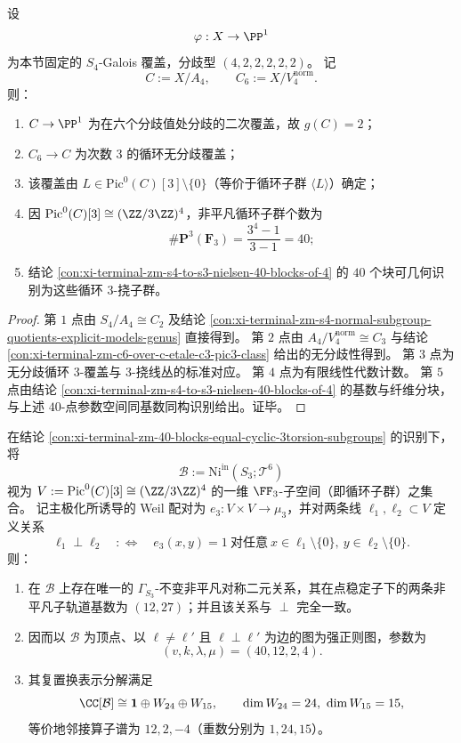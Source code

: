 \begin{conclusion}\label{con:xi-terminal-zm-40-blocks-equal-cyclic-3torsion-subgroups}
设
\[
\varphi:X\to\PP^1
\]
为本节固定的 \(S_4\)-Galois 覆盖，分歧型 \((4,2,2,2,2,2)\)。
记
\[
C:=X/A_4,\qquad C_6:=X/V_4^{\mathrm{norm}}.
\]
则：
\begin{enumerate}
  \item \(C\to\PP^1\) 为在六个分歧值处分歧的二次覆盖，故 \(g(C)=2\)；
  \item \(C_6\to C\) 为次数 \(3\) 的循环无分歧覆盖；
  \item 该覆盖由 \(L\in \mathrm{Pic}^0(C)[3]\setminus\{0\}\)（等价于循环子群 \(\langle L\rangle\)）确定；
  \item 因 \(\mathrm{Pic}^0(C)[3]\cong (\ZZ/3\ZZ)^4\)，非平凡循环子群个数为
  \[
  \#\mathbf P^3(\mathbf F_3)=\frac{3^4-1}{3-1}=40;
  \]
  \item 结论 \ref{con:xi-terminal-zm-s4-to-s3-nielsen-40-blocks-of-4} 的 \(40\) 个块可几何识别为这些循环 \(3\)-挠子群。
\end{enumerate}
\end{conclusion}
\begin{proof}
第 \(1\) 点由 \(S_4/A_4\cong C_2\) 及结论
\ref{con:xi-terminal-zm-s4-normal-subgroup-quotients-explicit-models-genus}
直接得到。
第 \(2\) 点由 \(A_4/V_4^{\mathrm{norm}}\cong C_3\) 与结论
\ref{con:xi-terminal-zm-c6-over-c-etale-c3-pic3-class}
给出的无分歧性得到。
第 \(3\) 点为无分歧循环 \(3\)-覆盖与 \(3\)-挠线丛的标准对应。
第 \(4\) 点为有限线性代数计数。
第 \(5\) 点由结论 \ref{con:xi-terminal-zm-s4-to-s3-nielsen-40-blocks-of-4} 的基数与纤维分块，与上述 \(40\)-点参数空间同基数同构识别给出。证毕。
\end{proof}

\begin{theorem}[块轨道的辛正交刻画与强正则结构]\label{thm:xi-terminal-zm-block-orbits-symplectic-orthogonality-srg}
在结论 \ref{con:xi-terminal-zm-40-blocks-equal-cyclic-3torsion-subgroups} 的识别下，将
\[
\mathcal B:=\mathrm{Ni}^{\mathrm{in}}(S_3;\mathcal T^6)
\]
视为 \(V:=\mathrm{Pic}^0(C)[3]\cong (\ZZ/3\ZZ)^4\) 的一维 \(\FF_3\)-子空间（即循环子群）之集合。
记主极化所诱导的 Weil 配对为 \(e_3:V\times V\to\mu_3\)，并对两条线 \(\ell_1,\ell_2\subset V\) 定义关系
\[
\ell_1\perp \ell_2
\quad:\Longleftrightarrow\quad
e_3(x,y)=1\ \text{对任意}\ x\in\ell_1\setminus\{0\},\ y\in\ell_2\setminus\{0\}.
\]
则：
\begin{enumerate}
  \item 在 \(\mathcal B\) 上存在唯一的 \(\Gamma_{S_3}\)-不变非平凡对称二元关系，其在点稳定子下的两条非平凡子轨道基数为 \((12,27)\)；并且该关系与 \(\perp\) 完全一致。
  \item 因而以 \(\mathcal B\) 为顶点、以 \(\ell\neq\ell'\) 且 \(\ell\perp\ell'\) 为边的图为强正则图，参数为
  \[
  (v,k,\lambda,\mu)=(40,12,2,4).
  \]
  \item 其复置换表示分解满足
  \[
  \CC[\mathcal B]\cong \mathbf 1\oplus W_{24}\oplus W_{15},
  \qquad
  \dim W_{24}=24,\ \dim W_{15}=15,
  \]
  等价地邻接算子谱为 \(12,2,-4\)（重数分别为 \(1,24,15\)）。
\end{enumerate}
\end{theorem}

